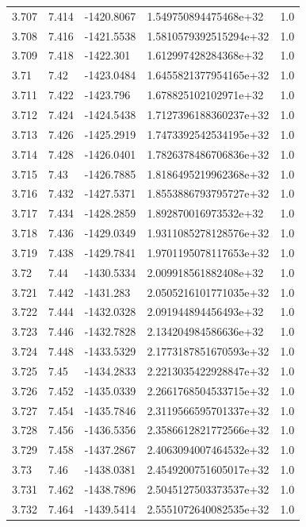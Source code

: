 \begin{tabular}{lllll}
3.707 & 7.414 & -1420.8067 & 1.549750894475468e+32 & 1.0 \\
3.708 & 7.416 & -1421.5538 & 1.5810579392515294e+32 & 1.0 \\
3.709 & 7.418 & -1422.301 & 1.612997428284368e+32 & 1.0 \\
3.71 & 7.42 & -1423.0484 & 1.6455821377954165e+32 & 1.0 \\
3.711 & 7.422 & -1423.796 & 1.678825102102971e+32 & 1.0 \\
3.712 & 7.424 & -1424.5438 & 1.7127396188360237e+32 & 1.0 \\
3.713 & 7.426 & -1425.2919 & 1.7473392542534195e+32 & 1.0 \\
3.714 & 7.428 & -1426.0401 & 1.7826378486706836e+32 & 1.0 \\
3.715 & 7.43 & -1426.7885 & 1.8186495219962368e+32 & 1.0 \\
3.716 & 7.432 & -1427.5371 & 1.8553886793795727e+32 & 1.0 \\
3.717 & 7.434 & -1428.2859 & 1.892870016973532e+32 & 1.0 \\
3.718 & 7.436 & -1429.0349 & 1.9311085278128576e+32 & 1.0 \\
3.719 & 7.438 & -1429.7841 & 1.9701195078117653e+32 & 1.0 \\
3.72 & 7.44 & -1430.5334 & 2.009918561882408e+32 & 1.0 \\
3.721 & 7.442 & -1431.283 & 2.0505216101771035e+32 & 1.0 \\
3.722 & 7.444 & -1432.0328 & 2.091944894456493e+32 & 1.0 \\
3.723 & 7.446 & -1432.7828 & 2.134204984586636e+32 & 1.0 \\
3.724 & 7.448 & -1433.5329 & 2.1773187851670593e+32 & 1.0 \\
3.725 & 7.45 & -1434.2833 & 2.2213035422928847e+32 & 1.0 \\
3.726 & 7.452 & -1435.0339 & 2.2661768504533715e+32 & 1.0 \\
3.727 & 7.454 & -1435.7846 & 2.3119566595701337e+32 & 1.0 \\
3.728 & 7.456 & -1436.5356 & 2.3586612821772566e+32 & 1.0 \\
3.729 & 7.458 & -1437.2867 & 2.4063094007464532e+32 & 1.0 \\
3.73 & 7.46 & -1438.0381 & 2.4549200751605017e+32 & 1.0 \\
3.731 & 7.462 & -1438.7896 & 2.5045127503373537e+32 & 1.0 \\
3.732 & 7.464 & -1439.5414 & 2.5551072640082535e+32 & 1.0 \\

\end{tabular}
